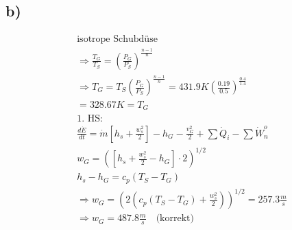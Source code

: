 

\subsection*{b)}

\begin{align*}
&\text{isotrope Schubdüse} \\
&\Rightarrow \frac{T_G}{T_S} = \left( \frac{P_G}{P_S} \right)^{\frac{n-1}{n}} \\
&\Rightarrow T_G = T_S \left( \frac{P_G}{P_S} \right)^{\frac{n-1}{n}} = 431.9K \left( \frac{0.19}{0.5} \right)^{\frac{0.4}{1.4}} \\
&= 328.67K = T_G \\
&\text{1. HS:} \\
&\frac{d\dot{E}}{dt} = \dot{m} \left[ h_s + \frac{w_s^2}{2} \right] - h_G - \frac{v_G^2}{2} + \sum \dot{Q}_i - \sum \dot{W}_n^o \\
&w_G = \left( \left[ h_s + \frac{w_s^2}{2} - h_G \right] \cdot 2 \right)^{1/2} \\
&h_s - h_G = c_p (T_S - T_G) \\
&\Rightarrow w_G = \left( 2 \left( c_p (T_S - T_G) + \frac{w_s^2}{2} \right) \right)^{1/2} = 257.3 \frac{m}{s} \\
&\Rightarrow w_G = 487.8 \frac{m}{s} \quad \text{(korrekt)} \\
\end{align*}